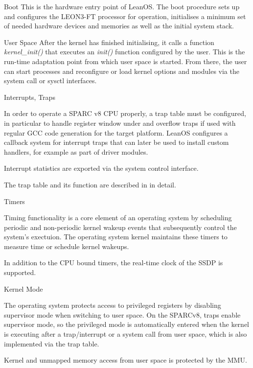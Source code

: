 %
{Boot}{%
This is the hardware entry point of LeanOS. The boot procedure sets up and
configures the \gls{LEON3-FT} processor for operation, initialises a minimum set of 
needed hardware devices and memories as well as the initial system stack.
}%
{}{}



{User Space}{%
After the kernel has finished initialising, it calls a function
\mbox{\emph{kernel\_init()}}
that executes an \emph{init()} function configured by the user. This is the
run-time adaptation point from which user space is started. From there, the user
can start processes and reconfigure or load kernel options and modules via the
system call or sysctl interfaces.
}%
{}{}



%
{Interrupts, Traps}
{In order to operate a \gls{SPARC} v8 \gls{CPU} properly, a trap table must be
configured, in particular to handle register window under and overflow traps if
used with regular \gls{GCC} code generation for the target platform.
LeanOS configures a callback system for interrupt traps that can later be used
to install custom handlers, for example as part of driver modules.\newline

Interrupt statistics are exported via the system control interface.
}%
{}%
{The trap table and its function are described in \cite{SPARCv8} in detail.}



%
{Timers}{%
Timing functionality is a core element of an operating system by scheduling
periodic and non-periodic kernel wakeup events that subsequently control the
system's exectuion. The operating system kernel maintains these timers to
measure time or schedule kernel wakeups.

In addition to the \gls{CPU} bound timers, the real-time clock of the \gls{SSDP}
is supported.
}%
{}{}


%
{Kernel Mode}{%
The operating system protects access to privileged registers by disabling
supervisor mode when switching to user space. On the \gls{SPARC}v8, traps enable
supervisor mode, so the privileged mode is automatically entered when the kernel
is executing after a trap/interrupt or a system call from user space, which is
also implemented via the trap table.\newline

Kernel and unmapped memory access from user space is protected by the \gls{MMU}.
}%
{}{}


